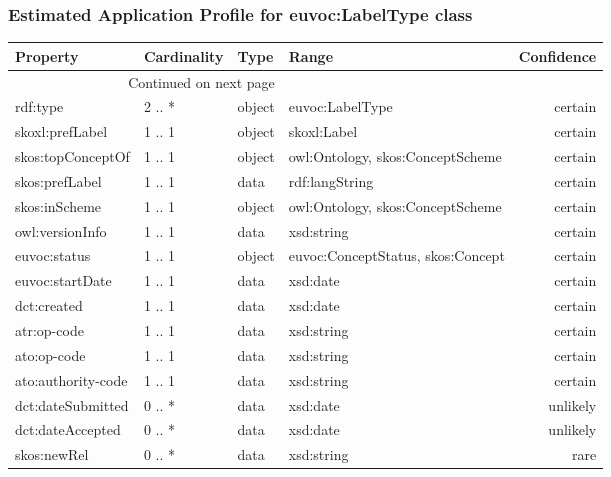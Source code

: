 \documentclass[10pt,a4paper,titlepage,final]{article}
\begin{document}
\subsubsection{Estimated Application Profile for euvoc:LabelType class}
\begin{tabularx}{\textwidth}{lllXr}
\toprule
           Property & Cardinality &    Type &                              Range & Confidence \\
\midrule
\endhead
\midrule
\multicolumn{3}{r}{{Continued on next page}} \\
\midrule
\endfoot

\bottomrule
\endlastfoot
           rdf:type &      2 .. * &  object &                    euvoc:LabelType &    certain \\
    skoxl:prefLabel &      1 .. 1 &  object &                        skoxl:Label &    certain \\
  skos:topConceptOf &      1 .. 1 &  object &   owl:Ontology, skos:ConceptScheme &    certain \\
     skos:prefLabel &      1 .. 1 &    data &                     rdf:langString &    certain \\
      skos:inScheme &      1 .. 1 &  object &   owl:Ontology, skos:ConceptScheme &    certain \\
    owl:versionInfo &      1 .. 1 &    data &                         xsd:string &    certain \\
       euvoc:status &      1 .. 1 &  object &  euvoc:ConceptStatus, skos:Concept &    certain \\
    euvoc:startDate &      1 .. 1 &    data &                           xsd:date &    certain \\
        dct:created &      1 .. 1 &    data &                           xsd:date &    certain \\
        atr:op-code &      1 .. 1 &    data &                         xsd:string &    certain \\
        ato:op-code &      1 .. 1 &    data &                         xsd:string &    certain \\
 ato:authority-code &      1 .. 1 &    data &                         xsd:string &    certain \\
  dct:dateSubmitted &      0 .. * &    data &                           xsd:date &   unlikely \\
   dct:dateAccepted &      0 .. * &    data &                           xsd:date &   unlikely \\
        skos:newRel &      0 .. * &    data &                         xsd:string &       rare \\
\end{tabularx}
\end{document}
